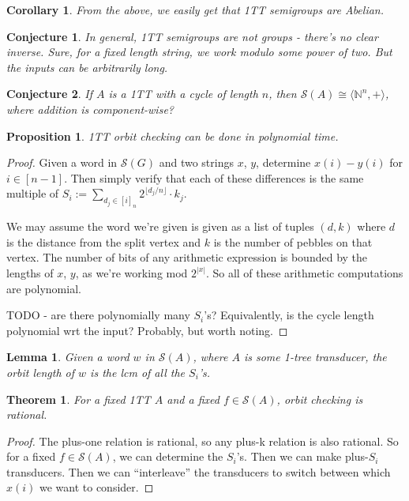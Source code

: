 \documentclass[11pt]{article}
\theoremstyle{pleasant}
\newtheorem{proposition}{Proposition}
\newtheorem{theorem}{Theorem}
\newtheorem{corollary}{Corollary}
\newtheorem{lemma}{Lemma}
\newtheorem{conjecture}{Conjecture}
\newcommand{\0}{\underline{0}}
\newcommand{\1}{\underline{1}}
\newcommand{\2}{\underline{2}}
\newcommand{\N}{\mathbb{N}}
\renewcommand{\S}{\mathcal{S}}
\begin{document}
\begin{corollary}
From the above, we easily get that 1TT semigroups are Abelian.
\end{corollary}

\begin{conjecture}
In general, 1TT semigroups are not groups - there's no clear inverse. Sure, for a fixed length string, we work modulo some power of two. But the inputs can be arbitrarily long.
\end{conjecture}

\begin{conjecture}
If $A$ is a 1TT with a cycle of length $n$, then $\S(A) \cong \langle \N^n, + \rangle$, where addition is component-wise?
\end{conjecture}

\begin{proposition}
1TT orbit checking can be done in polynomial time.
\end{proposition}
\begin{proof}
Given a word in $\S(G)$ and two strings $x$, $y$, determine $x(i) - y(i)$ for $i \in [n-1]$. Then simply verify that each of these differences is the same multiple of $S_i := \sum_{d_j \in [i]_n} 2^{\lfloor d_j / n\rfloor} \cdot k_j$.

We may assume the word we're given is given as a list of tuples $(d, k)$ where $d$ is the distance from the split vertex and $k$ is the number of pebbles on that vertex. The number of bits of any arithmetic expression is bounded by the lengths of $x$, $y$, as we're working mod $2^{|x|}$. So all of these arithmetic computations are polynomial.

TODO - are there polynomially many $S_i$'s? Equivalently, is the cycle length polynomial wrt the input? Probably, but worth noting.
\end{proof}

\begin{lemma}
Given a word $w$ in $\S(A)$, where $A$ is some 1-tree transducer, the orbit length of $w$ is the lcm of all the $S_i$'s.
\end{lemma}


\begin{theorem}
For a fixed 1TT $A$ and a fixed $f \in \S(A)$, orbit checking is rational.
\end{theorem}
\begin{proof}
The plus-one relation is rational, so any plus-k relation is also rational. So for a fixed $f \in \S(A)$, we can determine the $S_i$'s. Then we can make plus-$S_i$ transducers. Then we can ``interleave'' the transducers to switch between which $x(i)$ we want to consider.
\end{proof}
\end{document}
